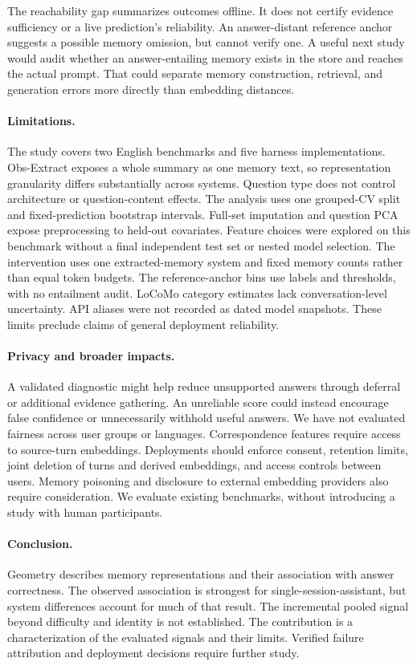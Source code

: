 \documentclass{article}
\begin{document}
The reachability gap summarizes outcomes offline.
It does not certify evidence sufficiency or a live prediction's reliability.
An answer-distant reference anchor suggests a possible memory omission,
but cannot verify one. A useful next study would audit whether an
answer-entailing memory exists in the store and reaches the actual prompt.
That could separate memory construction, retrieval, and generation errors
more directly than embedding distances.

\paragraph{Limitations.}
The study covers two English benchmarks and five harness implementations.
Obs-Extract exposes a whole summary as one memory text, so representation
granularity differs substantially across systems.
Question type does not control architecture or question-content effects.
The analysis uses one grouped-CV split and fixed-prediction bootstrap intervals.
Full-set imputation and question PCA expose preprocessing to held-out covariates.
Feature choices were explored on this benchmark without a final independent
test set or nested model selection.
The intervention uses one extracted-memory system and fixed memory counts
rather than equal token budgets.
The reference-anchor bins use labels and thresholds, with no entailment audit.
LoCoMo category estimates lack conversation-level uncertainty.
API aliases were not recorded as dated model snapshots.
These limits preclude claims of general deployment reliability.

\paragraph{Privacy and broader impacts.}
A validated diagnostic might help reduce unsupported answers through deferral
or additional evidence gathering. An unreliable score could instead encourage
false confidence or unnecessarily withhold useful answers.
We have not evaluated fairness across user groups or languages.
Correspondence features require access to source-turn embeddings.
Deployments should enforce consent, retention limits, joint deletion of turns
and derived embeddings, and access controls between users.
Memory poisoning and disclosure to external embedding providers also require
consideration. We evaluate existing benchmarks, without introducing
a study with human participants.

\paragraph{Conclusion.}
Geometry describes memory representations and their association with answer
correctness. The observed association is strongest for single-session-assistant,
but system differences account for much of that result.
The incremental pooled signal beyond difficulty and identity is not established.
The contribution is a characterization of the evaluated signals and their limits.
Verified failure attribution and deployment decisions require further study.
\end{document}
